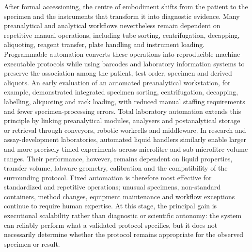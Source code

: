 \documentclass[12pt,a4paper]{article}
\begin{document}
After formal accessioning, the centre of embodiment shifts from the patient to the specimen and the instruments that transform it into diagnostic evidence. Many preanalytical and analytical workflows nevertheless remain dependent on repetitive manual operations, including tube sorting, centrifugation, decapping, aliquoting, reagent transfer, plate handling and instrument loading. Programmable automation converts these operations into reproducible machine-executable protocols while using barcodes and laboratory information systems to preserve the association among the patient, test order, specimen and derived aliquots. An early evaluation of an automated preanalytical workstation, for example, demonstrated integrated specimen sorting, centrifugation, decapping, labelling, aliquoting and rack loading, with reduced manual staffing requirements and fewer specimen-processing errors. Total laboratory automation extends this principle by linking preanalytical modules, analysers and postanalytical storage or retrieval through conveyors, robotic workcells and middleware. In research and assay-development laboratories, automated liquid handlers similarly enable larger and more precisely timed experiments across microlitre and sub-microlitre volume ranges. Their performance, however, remains dependent on liquid properties, transfer volume, labware geometry, calibration and the compatibility of the surrounding protocol. Fixed automation is therefore most effective for standardized and repetitive operations; unusual specimens, non-standard containers, method changes, equipment maintenance and workflow exceptions continue to require human expertise. At this stage, the principal gain is executional scalability rather than diagnostic or scientific autonomy: the system can reliably perform what a validated protocol specifies, but it does not necessarily determine whether the protocol remains appropriate for the observed specimen or result.
\end{document}
